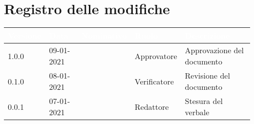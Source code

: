 \section*{Registro delle modifiche}
{
\setcounter{table}{-1}
{
\renewcommand{\arraystretch}{1.5}
\centering
\begin{longtable}{C{1.7cm} C{2.5cm} C{3.2cm} C{2.7cm} C{4.8cm}}
\textcolor{white}{\textbf{Versione}}&
\textcolor{white}{\textbf{Data}}&
\textcolor{white}{\textbf{Nominativo}}&
\textcolor{white}{\textbf{Ruolo}}&
\textcolor{white}{\textbf{Descrizione}}\\	
\endhead

1.0.0 & 09-01-2021 & \BM{} & Approvatore & Approvazione del documento\\	
0.1.0 & 08-01-2021 & \ZM{} & Verificatore & Revisione del documento\\		
0.0.1 & 07-01-2021 & \RA{} & Redattore & Stesura del verbale\\
		
\end{longtable}
}
}
